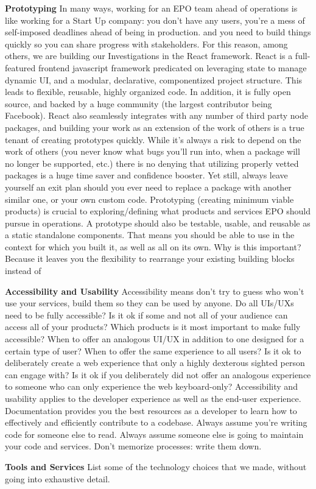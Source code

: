 \textbf{Prototyping}
In many ways, working for an EPO team ahead of operations is like working for a Start Up company: you don't have any users, you're a mess of self-imposed deadlines ahead of being in production. and you need to build things quickly so you can share progress with stakeholders.  For this reason, among others, we are building our Investigations in the React framework.  React is a full-featured frontend javascript framework predicated on leveraging state to manage dynamic UI, and a modular, declarative, componentized project structure. This leads to flexible, reusable, highly organized code.  In addition, it is fully open source, and backed by a huge community (the largest contributor being Facebook).  React also seamlessly integrates with any number of third party node packages, and building your work as an extension of the work of others is a true tenant of creating prototypes quickly.  While it's always a risk to depend on the work of others (you never know what bugs you'll run into, when a package will no longer be supported, etc.) there is no denying that utilizing properly vetted packages is a huge time saver and confidence booster.  Yet still, always leave yourself an exit plan should you ever need to replace a package with another similar one, or your own custom code.  Prototyping (creating minimum viable products) is crucial to exploring/defining what products and services EPO should pursue in operations.  A prototype should also be testable, usable, and reusable as a static standalone components.  That means you should be able to use in the context for which you built it, as well as all on its own.  Why is this important? Because it leaves you the flexibility to rearrange your existing building blocks instead of 


\textbf{Accessibility and Usability}
Accessibility means don't try to guess who won't use your services, build them so they can be used by anyone.
Do all UIs/UXs need to be fully accessible?
Is it ok if some and not all of your audience can access all of your products?  Which products is it most important to make fully accessible?
When to offer an analogous UI/UX in addition to one designed for a certain type of user? When to offer the same experience to all users?
Is it ok to deliberately create a web experience that only a highly dexterous sighted person can engage with?  Is it ok if you deliberately did not offer an analogous experience to someone who can only experience the web keyboard-only?
Accessibility and usability applies to the developer experience as well as the end-user experience.  Documentation provides you the best resources as a developer to learn how to effectively and efficiently contribute to a codebase.  Always assume you're writing code for someone else to read.  Always assume someone else is going to maintain your code and services.  Don't memorize processes: write them down.

\textbf{Tools and Services}
List some of the technology choices that we made, without going into exhaustive detail.  
